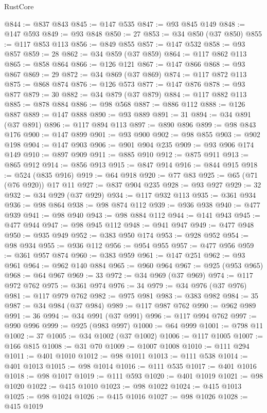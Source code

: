 \begin{lexlean}{RustCore}
\begin{coremodule}
@844 := @837 @843
@845 := @147 @535
@847 := @93 @845 @149
@848 := @147 @593
@849 := @93 @848
@850 := 27
@853 := @34 @850 (@37 @850)
@855 := @117 @853 @113
@856 := @849 @855
@857 := @147 @532
@858 := @93 @857
@859 := 28
@862 := @34 @859 (@37 @859)
@864 := @117 @862 @113
@865 := @858 @864
@866 := @126 @121
@867 := @147 @866
@868 := @93 @867
@869 := 29
@872 := @34 @869 (@37 @869)
@874 := @117 @872 @113
@875 := @868 @874
@876 := @126 @573
@877 := @147 @876
@878 := @93 @877
@879 := 30
@882 := @34 @879 (@37 @879)
@884 := @117 @882 @113
@885 := @878 @884
@886 := @98 @568
@887 := @886 @112
@888 := @126 @887
@889 := @147 @888
@890 := @93 @889
@891 := 31
@894 := @34 @891 (@37 @891)
@896 := @117 @894 @113
@897 := @890 @896
@899 := @98 @843 @176
@900 := @147 @899
@901 := @93 @900
@902 := @98 @855
@903 := @902 @198
@904 := @147 @903
@906 := @901 @904 @235
@909 := @93 @906 @174 @149
@910 := @897 @909
@911 := @885 @910
@912 := @875 @911
@913 := @865 @912
@914 := @856 @913
@915 := @847 @914
@916 := @844 @915
@918 := @524 (@835 @916)
@919 := @64 @918
@920 := @77 @83
@925 := @65 (@71 (@76 @920)) @17 @11
@927 := @837 @904 @235
@928 := @93 @927
@929 := 32
@932 := @34 @929 (@37 @929)
@934 := @117 @932 @113
@935 := @361 @934
@936 := @98 @864
@938 := @98 @874 @112
@939 := @936 @938
@940 := @477 @939
@941 := @98 @940
@943 := @98 @884 @112
@944 := @141 @943
@945 := @477 @944
@947 := @98 @945 @112
@948 := @941 @947
@949 := @477 @948
@950 := @935 @949
@952 := @383 @950 @174
@953 := @928 @952
@954 := @98 @934
@955 := @936 @112
@956 := @954 @955
@957 := @477 @956
@959 := @361 @957 @874
@960 := @383 @959
@961 := @147 @251
@962 := @93 @961
@964 := @962 @140 @884
@965 := @960 @964
@967 := @925 (@953 @965)
@968 := @64 @967
@969 := 33
@972 := @34 @969 (@37 @969)
@974 := @117 @972 @762
@975 := @361 @974
@976 := 34
@979 := @34 @976 (@37 @976)
@981 := @117 @979 @762
@982 := @975 @981
@983 := @383 @982
@984 := 35
@987 := @34 @984 (@37 @984)
@989 := @117 @987 @762
@990 := @962 @989
@991 := 36
@994 := @34 @991 (@37 @991)
@996 := @117 @994 @762
@997 := @990 @996
@999 := @925 (@983 @997)
@1000 := @64 @999
@1001 := @798 @11
@1002 := 37
@1005 := @34 @1002 (@37 @1002)
@1006 := @117 @1005
@1007 := @166 @815
@1008 := @31 @70
@1009 := @1007 @1008
@1010 := @111 @294
@1011 := @401 @1010
@1012 := @98 @1011
@1013 := @111 @538
@1014 := @401 @1013
@1015 := @98 @1014
@1016 := @111 @535
@1017 := @401 @1016
@1018 := @98 @1017
@1019 := @111 @593
@1020 := @401 @1019
@1021 := @98 @1020
@1022 := @415 @1010
@1023 := @98 @1022
@1024 := @415 @1013
@1025 := @98 @1024
@1026 := @415 @1016
@1027 := @98 @1026
@1028 := @415 @1019

\end{coremodule}
\end{lexlean}
